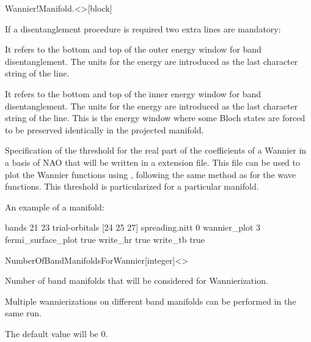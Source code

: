 \begin{fdfentry}{Wannier!Manifold.<>}[block]
\begin{fdfoptions}
      If a disentanglement procedure is required two extra lines are mandatory:

      \option[window]%

      It refers to the bottom and top of the outer
      energy window for band disentanglement. The units for the energy are
      introduced as the last character string of the line.


      It refers to the bottom and top of the inner
      energy window for band disentanglement. The units for the energy are
      introduced as the last character string of the line.
      This is the energy window where some Bloch states are forced to be
      preserved identically in the projected manifold.

      \option[threshold]%

      Specification of the threshold for the real part of the
      coefficients of a Wannier in a basis of NAO that will be written in
      a  extension file.
      This file can be used to plot the Wannier functions using
      , following the same method as for the wave functions.
      This threshold is particularized for a particular manifold.

    \end{fdfoptions}

    An example of a manifold:

    \begin{fdfexample}
    bands 21 23
    trial-orbitals [24 25 27]
    spreading.nitt 0
    wannier_plot 3
    fermi_surface_plot true
    write_hr true
    write_tb true
    \end{fdfexample}

  \end{fdfentry}



  \iffalse
  \begin{fdfentry}{NumberOfBandManifoldsForWannier}[integer]<>

    Number of band manifolds that will be considered for Wannierization.

    Multiple wannierizations on different band manifolds can be performed in the same
     run.

    \note The default value will be 0.

  \end{fdfentry}

